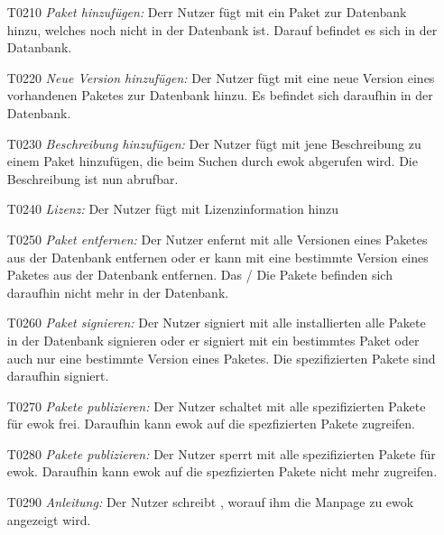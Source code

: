 \begin{itemize}
	\item[T0210] \textit{Paket hinzufügen:} Derr Nutzer fügt mit  ein Paket zur Datenbank hinzu, welches noch nicht in der Datenbank ist. Darauf befindet es sich in der Datanbank.
	\item[T0220] \textit{Neue Version hinzufügen:} Der Nutzer fügt mit  eine neue Version eines vorhandenen Paketes zur Datenbank hinzu. Es befindet sich daraufhin in der Datenbank.
	\item[T0230] \textit{Beschreibung hinzufügen:} Der Nutzer fügt mit  jene Beschreibung zu einem Paket hinzufügen, die beim Suchen durch ewok abgerufen wird. Die Beschreibung ist nun abrufbar.
	\item[T0240] \textit{Lizenz:} Der Nutzer fügt mit  Lizenzinformation hinzu
	\item[T0250] \textit{Paket entfernen:} Der Nutzer enfernt mit  alle Versionen eines Paketes aus der Datenbank entfernen oder er kann mit  eine bestimmte Version eines Paketes aus der Datenbank entfernen. Das / Die Pakete befinden sich daraufhin nicht mehr in der Datenbank.
	\item[T0260] \textit{Paket signieren:} Der Nutzer signiert mit  alle installierten alle Pakete in der Datenbank signieren oder er signiert mit  ein bestimmtes Paket oder auch nur eine bestimmte Version eines Paketes. Die spezifizierten Pakete sind daraufhin signiert.
	\item[T0270] \textit{Pakete publizieren:} Der Nutzer schaltet mit  alle spezifizierten Pakete für ewok frei. Daraufhin kann ewok auf die spezfizierten Pakete zugreifen.
	\item[T0280] \textit{Pakete publizieren:} Der Nutzer sperrt mit  alle spezifizierten Pakete für ewok. Daraufhin kann ewok auf die spezfizierten Pakete nicht mehr zugreifen.
	\item[T0290] \textit{Anleitung:} Der Nutzer schreibt , worauf ihm die Manpage zu ewok angezeigt wird.
\end{itemize}

